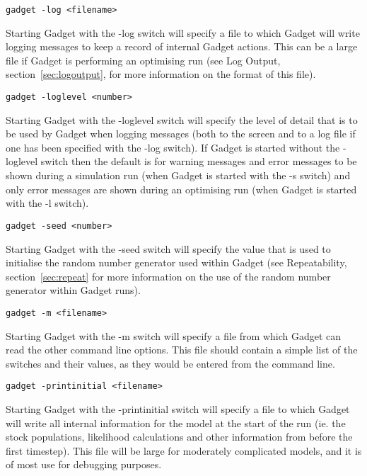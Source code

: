 \documentclass[10pt,twoside]{book}
\begin{document}
{\small\begin{verbatim}
gadget -log <filename>
\end{verbatim}}
Starting Gadget with the -log switch will specify a file to which Gadget will write logging messages to keep a record of internal Gadget actions.  This can be a large file if Gadget is performing an optimising run (see Log Output, section~\ref{sec:logoutput}, for more information on the format of this file).

{\small\begin{verbatim}
gadget -loglevel <number>
\end{verbatim}}
Starting Gadget with the -loglevel switch will specify the level of detail that is to be used by Gadget when logging messages (both to the screen and to a log file if one has been specified with the -log switch).  If Gadget is started without the -loglevel switch then the default is for warning messages and error messages to be shown during a simulation run (when Gadget is started with the -s switch) and only error messages are shown during an optimising run (when Gadget is started with the -l switch).

{\small\begin{verbatim}
gadget -seed <number>
\end{verbatim}}
Starting Gadget with the -seed switch will specify the value that is used to initialise the random number generator used within Gadget (see Repeatability, section~\ref{sec:repeat} for more information on the use of the random number generator within Gadget runs).

{\small\begin{verbatim}
gadget -m <filename>
\end{verbatim}}
Starting Gadget with the -m switch will specify a file from which Gadget can read the other command line options.  This file should contain a simple list of the switches and their values, as they would be entered from the command line.

\newpage %
{\small\begin{verbatim}
gadget -printinitial <filename>
\end{verbatim}}
Starting Gadget with the -printinitial switch will specify a file to which Gadget will write all internal information for the model at the start of the run (ie. the stock populations, likelihood calculations and other information from before the first timestep).  This file will be large for moderately complicated models, and it is of most use for debugging purposes.
\end{document}
